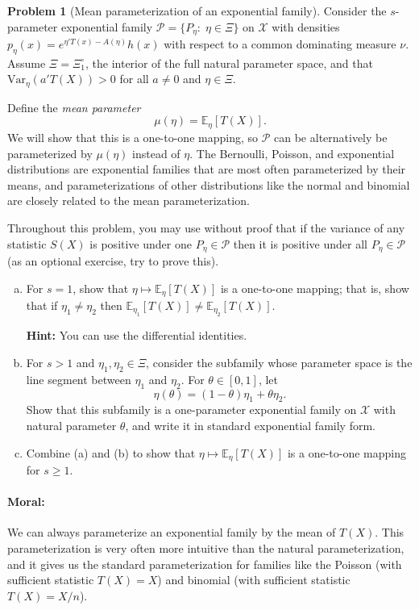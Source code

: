 \documentclass{article}
\newcommand{\cP}{\mathcal{P}}
\newcommand{\cX}{\mathcal{X}}
\newcommand{\EE}{\mathbb{E}}
\theoremstyle{definition}
\newtheorem{problem}{Problem}
\begin{document}
\begin{problem}[Mean parameterization of an exponential family]

  Consider the $s$-parameter exponential family $\cP = \{P_\eta:\; \eta \in \Xi\}$ on $\cX$ with densities $p_\eta(x) = e^{\eta'T(x) - A(\eta)}h(x)$ with respect to a common dominating measure $\nu$. Assume $\Xi=\Xi_1^{\circ}$, the interior of the full natural parameter space, and that $\text{Var}_\eta(a'T(X))>0$ for all $a \neq 0$ and $\eta\in \Xi$.

  Define the {\em mean parameter} 
  \[
  \mu(\eta) = \EE_\eta[T(X)].
  \]
  We will show that this is a one-to-one mapping, so $\cP$ can be alternatively be parameterized by $\mu(\eta)$ instead of $\eta$. The Bernoulli, Poisson, and exponential distributions are exponential families that are most often parameterized by their means, and parameterizations of other distributions like the normal and binomial are closely related to the mean parameterization.

  Throughout this problem, you may use without proof that if the variance of any statistic $S(X)$ is positive under one $P_\eta \in \cP$ then it is positive under all $P_\eta \in \cP$ (as an optional exercise, try to prove this).

  \begin{enumerate}[(a)]
    
  \item For $s=1$, show that $\eta \mapsto \EE_\eta[T(X)]$ is a one-to-one mapping; that is, show that if $\eta_1 \neq \eta_2$ then $\EE_{\eta_1}[T(X)] \neq \EE_{\eta_2}[T(X)]$.

    {\bf Hint:} You can use the differential identities.

    

  \item For $s>1$ and $\eta_1,\eta_2\in\Xi$, consider the subfamily whose parameter space is the line segment between $\eta_1$ and $\eta_2$. For $\theta \in [0,1]$, let
    \[
    \eta(\theta) = (1-\theta) \eta_1 + \theta \eta_2. 
    \]
    Show that this subfamily is a one-parameter exponential family on $\cX$ with natural parameter $\theta$, and write it in standard exponential family form.

    

  \item Combine (a) and (b) to show that $\eta \mapsto \EE_\eta[T(X)]$ is a one-to-one mapping for $s \geq 1$.

    


  \end{enumerate}

\paragraph{Moral:} We can always parameterize an exponential family by the mean of $T(X)$. This parameterization is very often more intuitive than the natural parameterization, and it gives us the standard parameterization for families like the Poisson (with sufficient statistic $T(X)=X$) and binomial (with sufficient statistic $T(X)=X/n$).
\end{problem}
\end{document}
